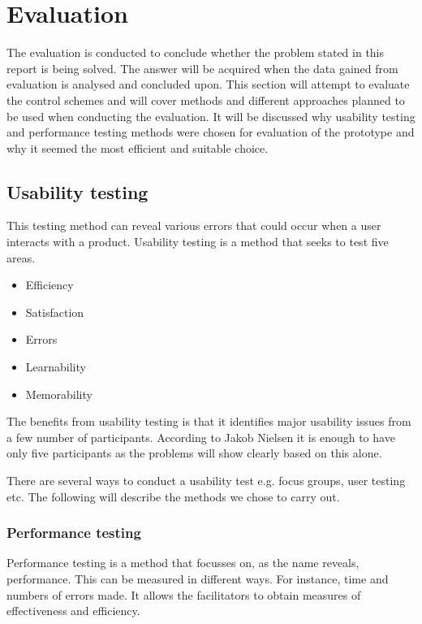 \section{Evaluation}
The evaluation is conducted to conclude whether the problem stated in this report is being solved. The answer will be acquired when the data gained from evaluation is analysed and concluded upon.
This section will attempt to evaluate the control schemes and will cover methods and different approaches planned to be used when conducting the evaluation. 
It will be discussed why usability testing and performance testing methods were chosen for evaluation of the prototype and why it seemed the most efficient and suitable choice. 

\subsection{Usability testing}

This testing method can reveal various errors that could occur when a user interacts with a product.
Usability testing is a method that seeks to test five areas. \cite{usability}

\begin{itemize}
\item Efficiency
\item Satisfaction
\item Errors
\item Learnability
\item Memorability
\end{itemize}

The benefits from usability testing is that it identifies major usability issues from a few number of participants. \cite{usability}
According to Jakob Nielsen it is enough to have only five participants as the problems will show clearly based on this alone. \cite{usability}

There are several ways to conduct a usability test e.g. focus groups, user testing etc.
The following will describe the methods we chose to carry out.

\subsubsection{Performance testing}

Performance testing is a method that focusses on, as the name reveals, performance. This can be measured in different ways. For instance, time and numbers of errors made.
It allows the facilitators to obtain measures of effectiveness and efficiency. \cite{performance}

